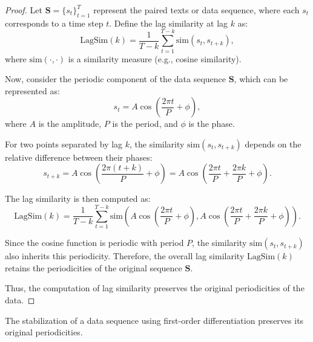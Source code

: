 \begin{proof}
Let $\bm{S} = \{s_t\}_{t=1}^T$ represent the paired texts or data sequence, where each $s_t$ corresponds to a time step $t$. Define the lag similarity at lag $k$ as:
\begin{equation}
\text{LagSim}(k) = \frac{1}{T-k} \sum_{t=1}^{T-k} \text{sim}(s_t, s_{t+k}),
\end{equation}
where $\text{sim}(\cdot, \cdot)$ is a similarity measure (e.g., cosine similarity).

Now, consider the periodic component of the data sequence $\bm{S}$, which can be represented as:
\begin{equation}
s_t = A \cos\left(\frac{2\pi t}{P} + \phi\right),
\end{equation}
where $A$ is the amplitude, $P$ is the period, and $\phi$ is the phase.

For two points separated by lag $k$, the similarity $\text{sim}(s_t, s_{t+k})$ depends on the relative difference between their phases:
\begin{equation}
s_{t+k} = A \cos\left(\frac{2\pi (t+k)}{P} + \phi\right) = A \cos\left(\frac{2\pi t}{P} + \frac{2\pi k}{P} + \phi\right).
\end{equation}

The lag similarity is then computed as:
\begin{equation}
\text{LagSim}(k) = \frac{1}{T-k} \sum_{t=1}^{T-k} \text{sim}\left(A \cos\left(\frac{2\pi t}{P} + \phi\right), A \cos\left(\frac{2\pi t}{P} + \frac{2\pi k}{P} + \phi\right)\right).
\end{equation}

Since the cosine function is periodic with period $P$, the similarity $\text{sim}(s_t, s_{t+k})$ also inherits this periodicity. Therefore, the overall lag similarity $\text{LagSim}(k)$ retains the periodicities of the original sequence $\bm{S}$.

Thus, the computation of lag similarity preserves the original periodicities of the data.
\end{proof}



\begin{proposition}
\label{proposition: first-order differentiation}
    The stabilization of a data sequence using first-order differentiation preserves its original periodicities.
\end{proposition}

